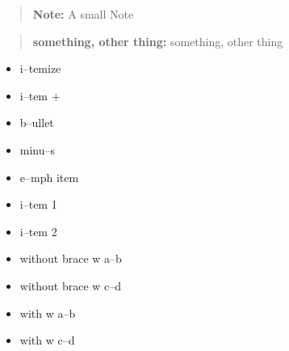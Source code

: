 \documentclass{book}
\begin{document}
\begin{titlepage}
\begin{quote}
\begin{footnotesize}
\textbf{Note:} A small Note
\end{footnotesize}
\end{quote}

\begin{quote}
\begin{footnotesize}
\textbf{something, other thing:} something, other thing
\end{footnotesize}
\end{quote}

\begin{itemize}
\item i--temize
\end{itemize}

\begin{itemize}[label=+]
\item i--tem +
\end{itemize}

\begin{itemize}[label=\textbullet{}]
\item b--ullet
\end{itemize}

\begin{itemize}[label=-]
\item minu--s
\end{itemize}

\begin{itemize}[label=\emph{after emph}]
\item e--mph item
\end{itemize}

\begin{itemize}[label=\textbullet{} a--n itemize line]
\item {}%
i--tem 1
\item i--tem 2
\end{itemize}

\begin{itemize}[label={}]
\item without brace w a--b
\item without brace w c--d
\end{itemize}

\begin{itemize}[label={}]
\item with w a--b
\item with w c--d
\end{itemize}


\end{titlepage}
\end{document}
